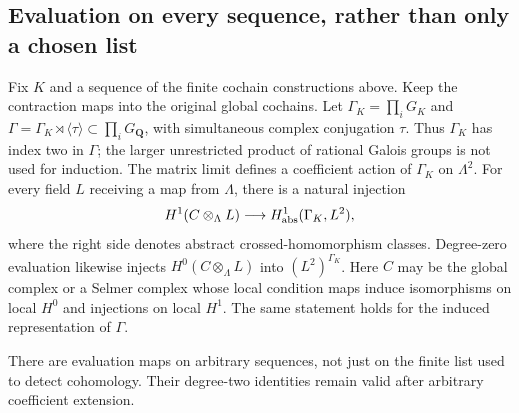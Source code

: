 \subsection{Evaluation on every sequence, rather than only a chosen list}

\begin{lemma}\label{rl:evaluation}
Fix $K$ and a sequence of the finite cochain constructions above.  Keep
the contraction maps into the original global cochains.  Let
$\Gamma_K=\prod_i G_K$ and
$\Gamma=\Gamma_K\rtimes\langle\tau\rangle\subset\prod_iG_{\mathbf Q}$,
with simultaneous complex conjugation $\tau$.  Thus $\Gamma_K$ has
index two in $\Gamma$; the larger unrestricted product of rational
Galois groups is not used for induction.  The matrix limit defines a
coefficient action of $\Gamma_K$ on $\Lambda^2$.  For every field $L$
receiving a map from $\Lambda$, there is a natural injection
\[
 H^1(C\otimes_\Lambda L)\longrightarrow
 H^1_{\rm abs}(\Gamma_K,L^2),
\]
where the right side denotes abstract crossed-homomorphism classes.
Degree-zero evaluation likewise injects
$H^0(C\otimes_\Lambda L)$ into $(L^2)^{\Gamma_K}$.
Here $C$ may be the global complex or a Selmer complex whose local
condition maps induce isomorphisms on local $H^0$ and injections on
local $H^1$.  The same statement holds for the induced representation
of $\Gamma$.

There are evaluation maps on arbitrary sequences, not just on the
finite list used to detect cohomology.  Their degree-two identities
remain valid after arbitrary coefficient extension.
\end{lemma}

